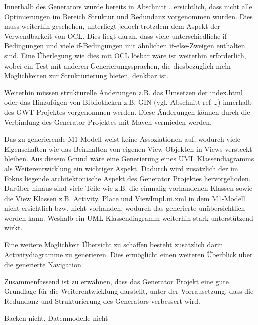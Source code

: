 Innerhalb des Generators wurde bereits in Abschnitt \ldots ersichtlich, dass
nicht alle Optimierungen im Bereich Struktur und Redundanz vorgenommen wurden.
Dies muss weiterhin geschehen, unterliegt jedoch trotzdem dem Aspekt der
Verwendbarkeit von OCL. Dies liegt daran, dass viele
unterschiedliche if-Bedingungen und viele if-Bedingungen mit ähnlichen
if-else-Zweigen enthalten sind. Eine Überlegung wie dies mit OCL lösbar wäre
ist weiterhin erforderlich, wobei ein Test mit anderen Generierungssprachen,
die diesbezüglich mehr Möglichkeiten zur Strukturierung bieten, denkbar ist.

Weiterhin müssen strukturelle Änderungen z.B. das Umsetzen der
index.html oder das Hinzufügen von Bibliotheken z.B. GIN (vgl. Abschnitt ref
\ldots) innerhalb des GWT Projektes vorgenommen werden. Diese Änderungen können
durch die Verbindung des Generator Projektes mit Maven vermieden werden.

Das zu generierende M1-Modell weist keine Assoziationen auf, wodurch viele
Eigenschaften wie das Beinhalten von eigenen View Objekten in Views versteckt
bleiben. Aus diesem Grund wäre eine Generierung eines UML Klassendiagramms als
Weiterentwicklung ein wichtiger Aspekt. Dadurch wird zusätzlich der im Fokus
liegende architektonische Aspekt des Generator Projektes hervorgehoden.
Darüber hinaus sind viele Teile wie z.B. die einmalig vorhandenen Klassen sowie die View
Klassen z.B. Activity, Place und ViewImpl.ui.xml in dem M1-Modell nicht
ersichtlich bzw. nicht vorhanden, wodurch das generierte unübersichtlich werden
kann. Weshalb ein UML Klassendiagramm weiterhin stark unterstützend wirkt. 

Eine weitere Möglichkeit Übersicht zu schaffen besteht zusätzlich darin
Activitydiagramme zu generieren. Dies ermöglicht einen weiteren Überblick über
die generierte Navigation.

Zusammenfassend ist zu erwähnen, dass das Generator Projekt eine gute
Grundlage für die Weiterentwicklung darstellt, unter der Vorrausetzung, dass die
Redundanz und Strukturierung des Generators verbessert wird.

Backen nicht. Datenmodelle nicht